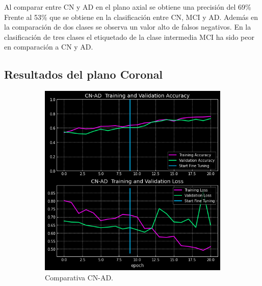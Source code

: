 Al comparar entre CN y AD en el plano axial se obtiene una precisión del 69\%
Frente al 53\% que se obtiene en la clasificación entre CN, MCI y AD. Además  en la comparación de dos clases se
observa un valor alto de falsos negativos.
En la clasificación de tres clases el etiquetado de la clase intermedia MCI ha sido  peor en comparación a CN y AD.


\subsection{Resultados del plano Coronal}\label{subsec:resultados-del-plano-coronal}

\begin{figure}[H]
    \centering
    \begin{subfigure}{0.45\textwidth}
        \includegraphics[width=\textwidth]{./imgs/resultados/coronal/CN_AD_output_CORONAL}
        \caption{Comparativa CN-AD. }
        \label{fig:coronal-cn-ad}
    \end{subfigure}
    \hspace*{\fill}
    \begin{subfigure}{0.45\textwidth}

\end{subfigure}
\end{figure}
